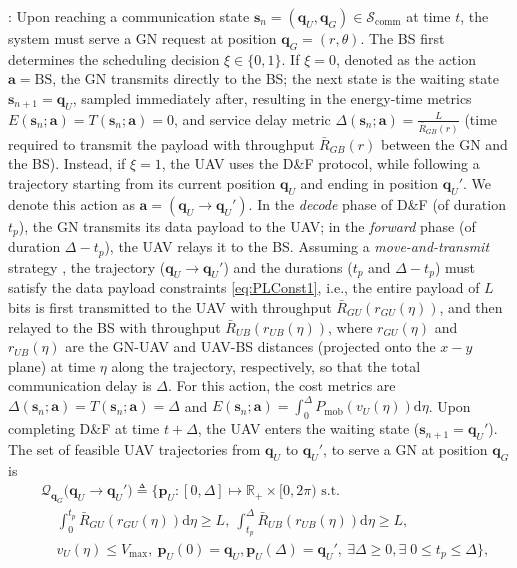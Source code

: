 \documentclass[12pt, draftcls, onecolumn]{IEEEtran}
\theoremstyle{plain}
\theoremstyle{definition}
\theoremstyle{remark}
\begin{document}
: Upon reaching a communication state $\mathbf{s}_{n}{=}(\mathbf{q}_{U},\mathbf{q}_{G}){\in}\mathcal{S}_{\mathrm{comm}}$ at time $t$, the system must serve a GN request at position $\mathbf{q}_{G}{=}(r,\theta)$. The BS first determines the scheduling decision $\xi{\in}\{0,1\}$. If $\xi{=}0$,
 denoted as the action $\mathbf a{=}\mathrm{BS}$,
 the GN transmits directly to the BS; the next state is 
the waiting state $\mathbf{s}_{n{+}1}{=}\mathbf{q}_{U}$, sampled immediately after, resulting in the energy-time metrics
$E(\mathbf{s}_{n};\mathbf{a}){=}T(\mathbf{s}_{n};\mathbf{a}){=}0$, and service delay metric $\Delta(\mathbf{s}_{n};\mathbf{a}){=}\frac{L}{\bar R_{GB}(r)}$ (time required to transmit the payload with throughput $\bar R_{GB}(r)$ between the GN and the BS).
Instead, if $\xi{=}1$, the UAV uses the D\&F protocol, while following a trajectory starting from its current position $\mathbf{q}_{U}$ and ending in position $\mathbf{q}_{U}'$. We denote this action as $\mathbf a{=}(\mathbf q_U{\rightarrow}\mathbf q_{U}')$. In the \emph{decode} phase of D\&F (of duration $t_{p}$), the GN transmits its data payload to the UAV; in the \emph{forward} phase (of duration $\Delta{-}t_{p}$), the UAV relays it to the BS. Assuming a \emph{move-and-transmit} strategy \cite{SCA}, the trajectory ($\mathbf{q}_{U}{\rightarrow}{\mathbf{q}}_{U}'$) and the durations ($t_{p}$ and $\Delta{-}t_{p}$) must satisfy the data payload constraints \eqref{eq:PLConst1}, i.e., the entire payload of $L$ bits is first transmitted to the UAV with throughput $\bar R_{GU}(r_{GU}(\eta))$, and then relayed to the BS
with throughput $\bar{R}_{UB}(r_{UB}(\eta))$, where
 $r_{GU}({\eta})$  and $r_{UB}(\eta)$ are the GN-UAV and UAV-BS distances (projected onto the $x{-}y$ plane) at time $\eta$ along the trajectory, respectively, so that the total communication delay is $\Delta$. For this action, the cost metrics are $\Delta(\mathbf{s}_{n};\mathbf{{a}}){=}T(\mathbf{s}_{n};\mathbf{{a}}){=}\Delta$ and $E(\mathbf{s}_{n};\mathbf{{a}}){=}\int_{0}^{\Delta}P_{\mathrm{mob}}\left(v_{U}(\eta)\right)\mathrm{d}\eta$. Upon completing D\&F at time $t{+}\Delta$, the UAV enters the waiting state ($\mathbf{s}_{n{+}1}{=}\mathbf{q}_{U}'$). The set of feasible UAV trajectories from $\mathbf{q}_{U}$ to $\mathbf{q}_{U}'$, to serve a GN at position $\mathbf{q}_{G}$ is
\begin{align}
\label{eq12}
&	\mathcal{Q}_{\mathbf q_G} \big({\mathbf q}_U\rightarrow{\mathbf q}_U'\big) \triangleq \Big\{ \mathbf{p}_{U} : [0,\Delta] \mapsto \mathbb{R}_{+} \times[0,2\pi)\text{ s.t.}\\
	& \;\;\;\; \int_{0}^{t_{p}} \bar{R}_{GU}(r_{GU}(\eta)) \mathrm d \eta \geq L, \ \int_{t_p}^{\Delta} \bar R_{UB}(r_{UB}(\eta)) \mathrm d \eta \geq L, \label{eq:PLConst1}\tag{C.1}\\
	& \;\;\;\; v_U (\eta) \leq V_{\mathrm{max}},\ 
\mathbf{p}_{U}(0) ={\mathbf q}_U, \mathbf{p}_{U}(\Delta) ={\mathbf q}_U',\label{eq:IFConst1}\ \exists \Delta \geq 0, \exists\; 0 \leq t_p \leq \Delta \Big\},\tag{C.2}
\end{align}
\end{document}
